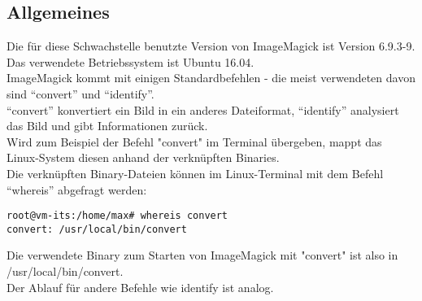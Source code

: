 \subsection{Allgemeines}\label{subsec:allgemeines}

Die für diese Schwachstelle benutzte Version von ImageMagick ist Version 6.9.3-9.\\
Das verwendete Betriebssystem ist Ubuntu 16.04.\\

ImageMagick kommt mit einigen Standardbefehlen - die meist verwendeten davon sind "`convert"' und "`identify"'.\\
"`convert"' konvertiert ein Bild in ein anderes Dateiformat, "`identify"' analysiert das Bild und gibt Informationen zurück.\\

Wird zum Beispiel der Befehl "convert" im Terminal übergeben, mappt das Linux-System diesen anhand der verknüpften Binaries.\\

Die verknüpften Binary-Dateien können im Linux-Terminal mit dem Befehl "`whereis"' abgefragt werden:\\

\begin{lstlisting}[language=Text, caption=whereis Binary Abfrage,label={lst:lstlisting}]
root@vm-its:/home/max# whereis convert
convert: /usr/local/bin/convert
\end{lstlisting}
\vspace{5mm}

Die verwendete Binary zum Starten von ImageMagick mit "convert" ist also in \\/usr/local/bin/convert.\\
Der Ablauf für andere Befehle wie identify ist analog.\\